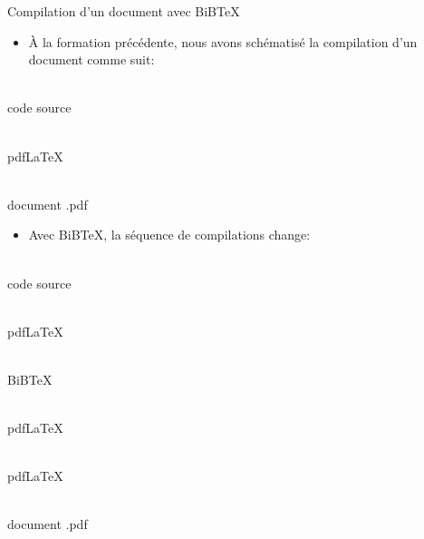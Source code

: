 \begin{frame}[c]{Compilation d'un document avec BiB\TeX}
	\begin{itemize}
		\item À la formation précédente, nous avons schématisé la compilation d'un document comme suit:
	\end{itemize}
	{
		\begin{minipage}[t]{0.25\linewidth}
			\centering
			{\Large\faFileTextO} \\
			code source
		\end{minipage}
		\hfill{\Large\faArrowRight}\hfill
		\begin{minipage}[t]{0.25\linewidth}
			\centering
			{\Large\faCogs} \\
			pdf\LaTeX
		\end{minipage}
		\hfill{\Large\faArrowRight}\hfill
		\begin{minipage}[t]{0.25\linewidth}
			\centering
			{\Large\faFilePdfO} \\
			document .pdf
		\end{minipage}
	}
	
	\pause
	
	\begin{itemize}
		\item Avec BiB\TeX, la séquence de compilations change:		
	\end{itemize}

	{
		\begin{minipage}[t]{0.125\linewidth}
			\centering
			{\Large\faFileTextO} \\
			code source
		\end{minipage}
		\hfill{\Large\faArrowRight}\hfill
		\begin{minipage}[t]{0.125\linewidth}
			\centering
			{\Large\faCogs} \\
			pdf\LaTeX
		\end{minipage}
		\hfill{\Large\faArrowRight}\hfill
		\begin{minipage}[t]{0.125\linewidth}
			\centering
			{\Large\faCogs} \\
			BiB\TeX
		\end{minipage}
		\hfill{\Large\faArrowRight}\hfill
		\begin{minipage}[t]{0.125\linewidth}
			\centering
			{\Large\faCogs} \\
			pdf\LaTeX
		\end{minipage}
		\hfill{\Large\faArrowRight}\hfill
		\begin{minipage}[t]{0.125\linewidth}
			\centering
			{\Large\faCogs} \\
			pdf\LaTeX
		\end{minipage}
		\hfill{\Large\faArrowRight}\hfill
		\begin{minipage}[t]{0.125\linewidth}
			\centering
			{\Large\faFilePdfO} \\
			document .pdf
		\end{minipage}
	}
\end{frame}

